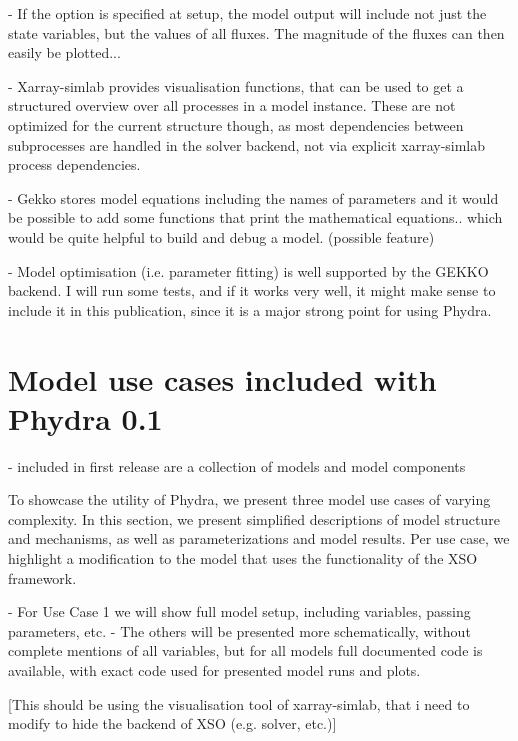 \documentclass[journal abbreviation, manuscript]{copernicus}
\begin{document}
- If the option is specified at setup, the model output will include not just the state variables, but the values of all fluxes. The magnitude of the fluxes can then easily be plotted...

- Xarray-simlab provides visualisation functions, that can be used to get a structured overview over all processes in a model instance. These are not optimized for the current structure though, as most dependencies between subprocesses are handled in the solver backend, not via explicit xarray-simlab process dependencies.

- Gekko stores model equations including the names of parameters and it would be possible to add some functions that print the mathematical equations.. which would be quite helpful to build and debug a model. (possible feature)

- Model optimisation (i.e. parameter fitting) is well supported by the GEKKO backend. I will run some tests, and if it works very well, it might make sense to include it in this publication, since it is a major strong point for using Phydra.


\clearpage



\section{Model use cases included with Phydra 0.1} \label{Section:UseCases}

- included in first release are a collection of models and model components

To showcase the utility of Phydra, we present three model use cases of varying complexity. In this section, we present simplified descriptions of model structure and mechanisms, as well as parameterizations and model results. Per use case, we highlight a modification to the model that uses the functionality of the XSO framework.

- For Use Case 1 we will show full model setup, including variables, passing parameters, etc.
- The others will be presented more schematically, without complete mentions of all variables, but for all models full documented code is available, with exact code used for presented model runs and plots.

[This should be using the visualisation tool of xarray-simlab, that i need to modify to hide the backend of XSO (e.g. solver, etc.)]
\end{document}
